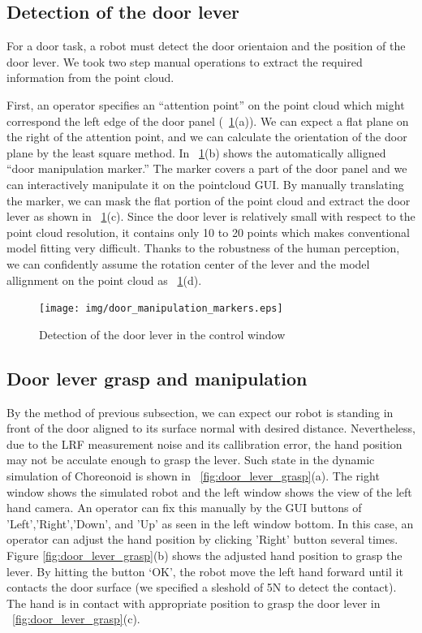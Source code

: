 \subsection{Detection of the door lever}
%
For a door task, a robot must detect the door orientaion and the position 
of the door lever. We took two step manual operations to extract the required information
from the point cloud. %

First, an operator specifies an ``attention point'' on the point cloud which might correspond the 
left edge of the door panel (\figurename~\ref{fig:door_manip_markers}(a)). We can expect a flat plane 
on the right of the attention point, and we can calculate the orientation of the door plane by the least square method.
In \figurename~\ref{fig:door_manip_markers}(b) shows the automatically alligned ``door manipulation marker.''
The marker covers a part of the door panel and we can interactively manipulate it on the 
pointcloud GUI. By manually translating the marker, we can mask the flat portion of 
the point cloud and extract the door lever as shown in \figurename~\ref{fig:door_manip_markers}(c).
Since the door lever is relatively small with respect to the point cloud resolution,
it contains only 10 to 20 points which makes conventional model fitting very difficult.
Thanks to the robustness of the human perception, we can confidently assume the rotation center of the lever
 and the model allignment on the point cloud as \figurename~\ref{fig:door_manip_markers}(d).

\begin{figure}[t]
  \centering
  \texttt{[image: img/door\_manipulation\_markers.eps]}
  \caption{Detection of the door lever in the control window}
  \label{fig:door_manip_markers}
\end{figure}
		

\subsection{Door lever grasp and manipulation}
%
By the method of previous subsection, we can expect 
our robot is standing in front of the door aligned to its surface normal with desired
distance. 
Nevertheless, due to the LRF measurement noise and its callibration error,
the hand position may not be acculate enough to grasp the lever. Such state in the dynamic simulation 
of Choreonoid is shown in \figurename~\ref{fig:door_lever_grasp}(a). 
The right window shows the simulated robot and the left 
window shows the view of the left hand camera. An operator can fix this manually by the GUI buttons of 
'Left','Right','Down', and 'Up' as seen in the left window bottom. In this case, an operator
can adjust the hand position by clicking 'Right' button several times.
Figure \ref{fig:door_lever_grasp}(b) shows the adjusted hand position to grasp the lever.
By hitting the button `OK', the robot move the left hand forward until it contacts the door surface (we specified a sleshold of 5N to detect the contact).  The hand is in contact with appropriate position to grasp the door lever in \figurename~\ref{fig:door_lever_grasp}(c).
   


